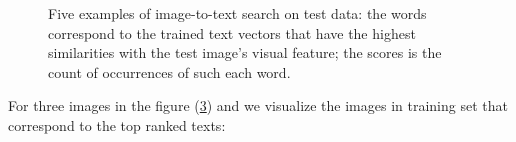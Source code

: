 \documentclass[12pt]{report}	%
\begin{document}
\begin{figure}[H]
\centering
{}
\label{fig:inria-dataset}
\end{figure} 

\begin{figure}[H]
\centering
{}
\label{fig:i2t}
\end{figure} 


\begin{figure}[H]
\centering
{}
 \caption{Five examples of image-to-text search on test data: the words correspond to the trained text vectors that have the highest similarities with the test image's visual feature; the scores is the count of occurrences of such each word.}
\label{fig:i2t}
\end{figure} 



For three images in the figure (\ref{fig:i2t}) and we visualize the images in training set that correspond to the top ranked texts:

\begin{figure}[H]
\centering
{}
\label{fig:inria-dataset}
\end{figure} 
\end{document}

